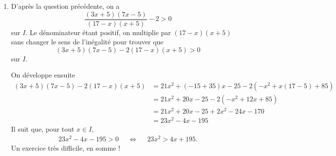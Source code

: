 {\begin{enumerate}
		La deuxième inégalité donne, par division par $x+5$,
			\[ \dfrac{7x-5}{x+5} > \dfrac{2(x+5)}{x+5} = 2, \]
		où on a utilisé que $2(x+5) >0$ sur $I$ pour s'assurer que le sens de l'inégalité ne change pas.
		
		On multiplie les deux inégalités ensembles et, par positivité, on conclut.
			
		\item
		D'après la question précédente, on a
			 \[ \dfrac{(3x+5)(7x-5)}{(17-x)(x+5)}- 2 > 0 \]
		sur $I$.
		Le dénominateur étant positif, on multiplie par $(17-x)(x+5)$ sans changer le sens de l'inégalité pour trouver que
			\[ (3x+5)(7x-5)-2(17-x)(x+5) > 0 \]
		sur $I$.
		
		 On développe ensuite
		 	\begin{align*}
		 		(3x+5)(7x-5)-2(17-x)(x+5) &= 21x^2 + (-15+35)x - 25 - 2(-x^2 + x(17-5)+85) \\
		 		&= 21x^2 + 20x - 25 -2(-x^2 + 12x + 85)  \\
		 		&= 21x^2 + 20x - 25 + 2x^2 - 24x - 170 \\
		 		&= 23x^2 - 4x - 195
			\end{align*}
		Il suit que, pour tout $x\in I$,
			\begin{align*}
				23x^2 - 4x - 195 > 0 && \iff && 23x^2 > 4x + 195.
			\end{align*}
		Un exercice très difficile, en somme !
	\end{enumerate}


}



